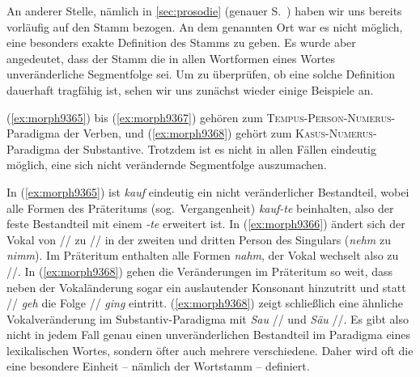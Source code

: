 An anderer Stelle, nämlich in \ref{sec:prosodie} (genauer S.~\pageref{abs:3453457}) haben wir uns bereits vorläufig auf den Stamm bezogen.
An dem genannten Ort war es nicht möglich, eine besonders exakte Definition des Stamms zu geben.
Es wurde aber angedeutet, dass der Stamm die in allen Wortformen eines Wortes unveränderliche Segmentfolge sei.
Um zu überprüfen, ob eine solche Definition dauerhaft tragfähig ist, sehen wir uns zunächst wieder einige Beispiele an.

\begin{exe}
  \ex \label{ex:morph9365}
  \begin{xlist}
  \end{xlist}
  \ex \label{ex:morph9366}
  \begin{xlist}
  \end{xlist}
  \ex \label{ex:morph9367}
  \begin{xlist}
  \end{xlist}
  \ex \label{ex:morph9368}
  \begin{xlist}
  \end{xlist}
\end{exe}

(\ref{ex:morph9365}) bis (\ref{ex:morph9367}) gehören zum \textsc{Tempus}-\textsc{Person}-\textsc{Numerus}-Paradigma der Verben, und (\ref{ex:morph9368}) gehört zum \textsc{Kasus}-\textsc{Numerus}-Paradigma der Substantive.
Trotzdem ist es nicht in allen Fällen eindeutig möglich, eine sich nicht verändernde Segmentfolge auszumachen.

In (\ref{ex:morph9365}) ist \textit{kauf} eindeutig ein nicht veränderlicher Bestandteil, wobei alle Formen des Präteritums (sog.\ Vergangenheit) \textit{kauf-te} beinhalten, also der feste Bestandteil mit einem \textit{-te} erweitert ist.
In (\ref{ex:morph9366}) ändert sich der Vokal von // zu // in der zweiten und dritten Person des Singulars (\textit{nehm} zu \textit{nimm}).
Im Präteritum enthalten alle Formen \textit{nahm}, der Vokal wechselt also zu //.
In (\ref{ex:morph9368}) gehen die Veränderungen im Präteritum so weit, dass neben der Vokaländerung sogar ein auslautender Konsonant hinzutritt und statt // \textit{geh} die Folge // \textit{ging} eintritt.
(\ref{ex:morph9368}) zeigt schließlich eine ähnliche Vokalveränderung im Substantiv-Paradigma mit \textit{Sau} // und \textit{Säu} //.
Es gibt also nicht in jedem Fall genau einen unveränderlichen Bestandteil im Paradigma eines lexikalischen Wortes, sondern öfter auch mehrere verschiedene.
Daher wird oft die eine besondere Einheit -- nämlich der Wortstamm -- definiert.

